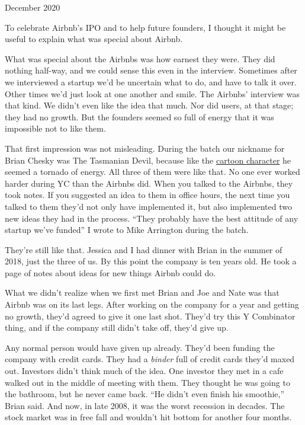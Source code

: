 December 2020

To celebrate Airbnb's IPO and to help future founders, I thought it
might be useful to explain what was special about Airbnb.

What was special about the Airbnbs was how earnest they were. They did
nothing half-way, and we could sense this even in the interview.
Sometimes after we interviewed a startup we'd be uncertain what to do,
and have to talk it over. Other times we'd just look at one another and
smile. The Airbnbs' interview was that kind. We didn't even like the
idea that much. Nor did users, at that stage; they had no growth. But
the founders seemed so full of energy that it was impossible not to like
them.

That first impression was not misleading. During the batch our nickname
for Brian Chesky was The Tasmanian Devil, because like the
\href{http://www.youtube.com/watch?v=StG2u5qfFRg&t=2m27s}{cartoon
character} he seemed a tornado of energy. All three of them were like
that. No one ever worked harder during YC than the Airbnbs did. When you
talked to the Airbnbs, they took notes. If you suggested an idea to them
in office hours, the next time you talked to them they'd not only have
implemented it, but also implemented two new ideas they had in the
process. ``They probably have the best attitude of any startup we've
funded'' I wrote to Mike Arrington during the batch.

They're still like that. Jessica and I had dinner with Brian in the
summer of 2018, just the three of us. By this point the company is ten
years old. He took a page of notes about ideas for new things Airbnb
could do.

What we didn't realize when we first met Brian and Joe and Nate was that
Airbnb was on its last legs. After working on the company for a year and
getting no growth, they'd agreed to give it one last shot. They'd try
this Y Combinator thing, and if the company still didn't take off,
they'd give up.

Any normal person would have given up already. They'd been funding the
company with credit cards. They had a \emph{binder} full of credit cards
they'd maxed out. Investors didn't think much of the idea. One investor
they met in a cafe walked out in the middle of meeting with them. They
thought he was going to the bathroom, but he never came back. ``He
didn't even finish his smoothie,'' Brian said. And now, in late 2008, it
was the worst recession in decades. The stock market was in free fall
and wouldn't hit bottom for another four months.

